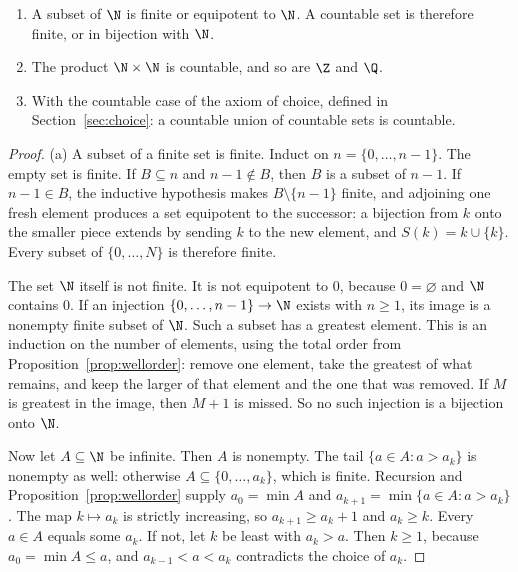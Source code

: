 \begin{proposition}\label{prop:countable}
\begin{enumerate}[label=(\alph*)]
\item A subset of $\N$ is finite or equipotent to $\N$. A countable set is therefore finite, or in bijection with $\N$.
\item The product $\N\times\N$ is countable, and so are $\Z$ and $\Q$.
\item With the countable case of the axiom of choice, defined in Section~\ref{sec:choice}: a countable union of countable sets is countable.
\end{enumerate}
\end{proposition}
\begin{proof}
(a) A subset of a finite set is finite. Induct on $n=\{0,\ldots,n-1\}$. The empty set is finite. If $B\subseteq n$ and $n-1\notin B$, then $B$ is a subset of $n-1$. If $n-1\in B$, the inductive hypothesis makes $B\setminus\{n-1\}$ finite, and adjoining one fresh element produces a set equipotent to the successor: a bijection from $k$ onto the smaller piece extends by sending $k$ to the new element, and $S(k)=k\cup\{k\}$. Every subset of $\{0,\ldots,N\}$ is therefore finite.

The set $\N$ itself is not finite. It is not equipotent to $0$, because $0=\varnothing$ and $\N$ contains $0$.
If an injection $\{0,\ldots,n-1\}\to\N$ exists with $n\ge 1$, its image is a nonempty finite subset of $\N$. Such a subset has a greatest element. This is an induction on the number of elements, using the total order from Proposition~\ref{prop:wellorder}: remove one element, take the greatest of what remains, and keep the larger of that element and the one that was removed. If $M$ is greatest in the image, then $M+1$ is missed. So no such injection is a bijection onto $\N$.

Now let $A\subseteq\N$ be infinite. Then $A$ is nonempty. The tail $\{a\in A:a>a_k\}$ is nonempty as well: otherwise $A\subseteq\{0,\ldots,a_k\}$, which is finite. Recursion and Proposition~\ref{prop:wellorder} supply $a_0=\min A$ and $a_{k+1}=\min\{a\in A:a>a_k\}$. The map $k\mapsto a_k$ is strictly increasing, so $a_{k+1}\ge a_k+1$ and $a_k\ge k$. Every $a\in A$ equals some $a_k$. If not, let $k$ be least with $a_k>a$. Then $k\ge 1$, because $a_0=\min A\le a$, and $a_{k-1}<a<a_k$ contradicts the choice of $a_k$.


\end{proof}

